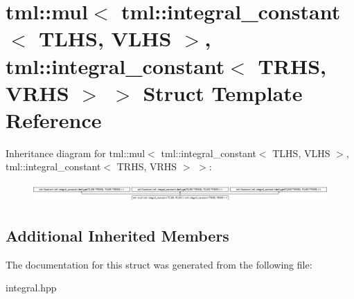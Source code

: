 \hypertarget{structtml_1_1mul_3_01tml_1_1integral__constant_3_01TLHS_00_01VLHS_01_4_00_01tml_1_1integral__con43246ce09e31ae76f3847693a25312ff}{\section{tml\+:\+:mul$<$ tml\+:\+:integral\+\_\+constant$<$ T\+L\+H\+S, V\+L\+H\+S $>$, tml\+:\+:integral\+\_\+constant$<$ T\+R\+H\+S, V\+R\+H\+S $>$ $>$ Struct Template Reference}
\label{structtml_1_1mul_3_01tml_1_1integral__constant_3_01TLHS_00_01VLHS_01_4_00_01tml_1_1integral__con43246ce09e31ae76f3847693a25312ff}
}
Inheritance diagram for tml\+:\+:mul$<$ tml\+:\+:integral\+\_\+constant$<$ T\+L\+H\+S, V\+L\+H\+S $>$, tml\+:\+:integral\+\_\+constant$<$ T\+R\+H\+S, V\+R\+H\+S $>$ $>$\+:\begin{figure}[H]
\begin{center}
\leavevmode
\includegraphics[height=0.713830cm]{structtml_1_1mul_3_01tml_1_1integral__constant_3_01TLHS_00_01VLHS_01_4_00_01tml_1_1integral__con43246ce09e31ae76f3847693a25312ff}
\end{center}
\end{figure}
\subsection*{Additional Inherited Members}


The documentation for this struct was generated from the following file\+:\begin{DoxyCompactItemize}
\item 
integral.\+hpp\end{DoxyCompactItemize}
